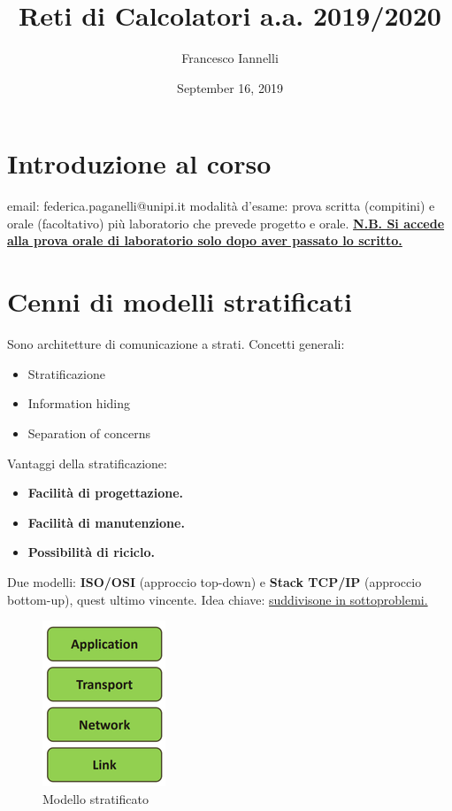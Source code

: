 \documentclass[11pt,a4paper]{article}
\theoremstyle{definition}
\begin{document}
\title{Reti di Calcolatori a.a. 2019/2020}
\author{Francesco Iannelli}
\date{September 16, 2019}
\maketitle

\newpage
\tableofcontents
\newpage

\section{Introduzione al corso}
email: federica.paganelli@unipi.it\newline
modalità d'esame: prova scritta (compitini) e orale (facoltativo) più\newline
laboratorio che prevede progetto e orale. \newline
\underline{\textbf{N.B. Si accede alla prova orale di laboratorio solo dopo aver passato lo scritto.}}

\section{Cenni di modelli stratificati}
Sono architetture di comunicazione a strati. \newline
Concetti generali:
\begin{itemize}
	\item Stratificazione
	\item Information hiding
	\item Separation of concerns
\end{itemize}
Vantaggi della stratificazione:
\begin{itemize}
	\item \textbf{Facilità di progettazione.}
	\item \textbf{Facilità di manutenzione.}
	\item \textbf{Possibilità di riciclo.}
\end{itemize}
Due modelli: \textbf{ISO/OSI} (approccio top-down) e \textbf{Stack TCP/IP} (approccio bottom-up), quest ultimo vincente.\newline
Idea chiave: \underline{suddivisone in sottoproblemi.}
\begin{figure}[!h]
	\includegraphics[scale=0.8]{Immagini/Modelli_Strat.png}
	\centering
	\caption{Modello stratificato}
\end{figure}
\end{document}
